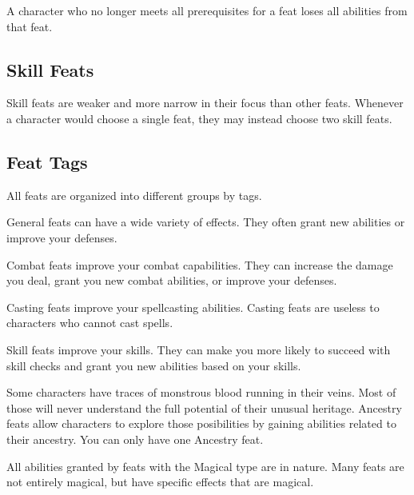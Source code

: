         A character who no longer meets all prerequisites for a feat loses all abilities from that feat.

    \subsection{Skill Feats}
        Skill feats are weaker and more narrow in their focus than other feats.
        Whenever a character would choose a single feat, they may instead choose two skill feats.

    \subsection{Feat Tags}
        All feats are organized into different groups by tags.

         General feats can have a wide variety of effects.
        They often grant new abilities or improve your defenses.

         Combat feats improve your combat capabilities.
        They can increase the damage you deal, grant you new combat abilities, or improve your defenses.

         Casting feats improve your spellcasting abilities.
        Casting feats are useless to characters who cannot cast spells.

         Skill feats improve your skills.
        They can make you more likely to succeed with skill checks and grant you new abilities based on your skills.

         Some characters have traces of monstrous blood running in their veins.
        Most of those will never understand the full potential of their unusual heritage.
        Ancestry feats allow characters to explore those posibilities by gaining abilities related to their ancestry.
        You can only have one Ancestry feat.

        All abilities granted by feats with the Magical type are \magical in nature.
        Many feats are not entirely magical, but have specific effects that are magical.

